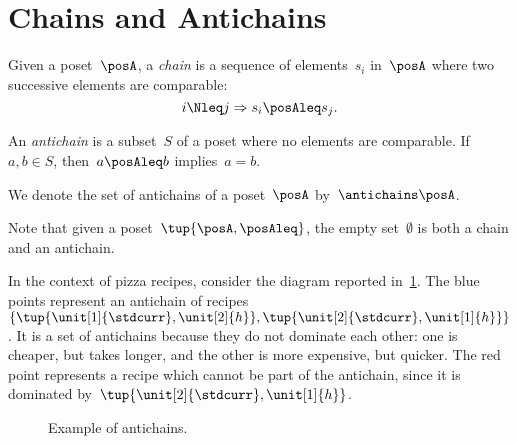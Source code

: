

\section{Chains and Antichains}
\label{sec:chains-antichains}

\begin{definition}
  \label{def:chain}
  Given a poset~$\posA$, a \emph{chain} is a sequence of elements~${s_i}$ in~$\posA$ where two successive elements are comparable:
  \begin{equation}
    i \Nleq j \Rightarrow s_i \posAleq s_j.
  \end{equation}
\end{definition}


\begin{definition}
  \label{def:antichain}
  An \emph{antichain} is a subset~$S$ of a poset where no elements are comparable.
  If~$a,b \in S$, then~$a \posAleq b$ implies~$a=b$.
\end{definition}

We denote the set of antichains of a poset~$\posA$ by~$\antichains\posA$.

\begin{remark}
  Note that given a poset~$\tup{\posA,\posAleq}$, the empty set~$\emptyset$ is both a chain and an antichain.
\end{remark}

In the context of pizza recipes, consider the diagram reported in~\cref{fig:antichain}.
The blue points represent an antichain of recipes~$\{\tup{\unit[1]{\stdcurr},\unit[2]{h}},\tup{\unit[2]{\stdcurr},\unit[1]{h}}\}$.
It is a set of antichains because they do not dominate each other: one is cheaper, but takes longer, and the other is more expensive, but quicker.
The red point represents a recipe which cannot be part of the antichain, since it is dominated by~$\tup{\unit[2]{\stdcurr},\unit[1]{h}}$.

\begin{figure}[h!]
  \begin{center}
  \end{center}
  \caption{Example of antichains. }
  \label{fig:antichain}
\end{figure}


